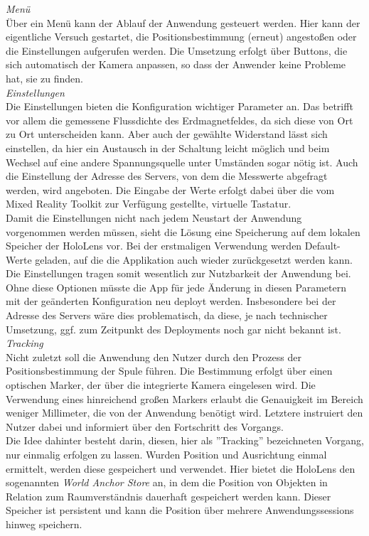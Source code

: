 \textit{Menü}\\
Über ein Menü kann der Ablauf der Anwendung gesteuert werden. Hier kann der eigentliche Versuch gestartet, die Positionsbestimmung (erneut) angestoßen oder die Einstellungen aufgerufen werden. Die Umsetzung erfolgt über Buttons, die sich automatisch der Kamera anpassen, so dass der Anwender keine Probleme hat, sie zu finden.\\

\textit{Einstellungen}\\
Die Einstellungen bieten die Konfiguration wichtiger Parameter an. Das betrifft vor allem die gemessene Flussdichte des Erdmagnetfeldes, da sich diese von Ort zu Ort unterscheiden kann. Aber auch der gewählte Widerstand lässt sich einstellen, da hier ein Austausch in der Schaltung leicht möglich und beim Wechsel auf eine andere Spannungsquelle unter Umständen sogar nötig ist. Auch die Einstellung der Adresse des Servers, von dem die Messwerte abgefragt werden, wird angeboten. Die Eingabe der Werte erfolgt dabei über die vom Mixed Reality Toolkit zur Verfügung gestellte, virtuelle Tastatur.\\

Damit die Einstellungen nicht nach jedem Neustart der Anwendung vorgenommen werden müssen, sieht die Lösung eine Speicherung auf dem lokalen Speicher der HoloLens vor. Bei der erstmaligen Verwendung werden Default-Werte geladen, auf die die Applikation auch wieder zurückgesetzt werden kann. Die Einstellungen tragen somit wesentlich zur Nutzbarkeit der Anwendung bei. Ohne diese Optionen müsste die App für jede Änderung in diesen Parametern mit der geänderten Konfiguration neu deployt werden. Insbesondere bei der Adresse des Servers wäre dies problematisch, da diese, je nach technischer Umsetzung, ggf. zum Zeitpunkt des Deployments noch gar nicht bekannt ist.\\

\textit{Tracking}\\
Nicht zuletzt soll die Anwendung den Nutzer durch den Prozess der Positionsbestimmung der Spule führen. Die Bestimmung erfolgt über einen optischen Marker, der über die integrierte Kamera eingelesen wird. Die Verwendung eines hinreichend großen Markers erlaubt die Genauigkeit im Bereich weniger Millimeter, die von der Anwendung benötigt wird. Letztere instruiert den Nutzer dabei und informiert über den Fortschritt des Vorgangs.\\
\noindent\hspace*{5mm}
Die Idee dahinter besteht darin, diesen, hier als ''Tracking'' bezeichneten Vorgang, nur einmalig erfolgen zu lassen. Wurden Position und Ausrichtung einmal ermittelt, werden diese gespeichert und verwendet. Hier bietet die HoloLens den sogenannten \textit{World Anchor Store} an, in dem die Position von Objekten in Relation zum Raumverständnis dauerhaft gespeichert werden kann. Dieser Speicher ist persistent und kann die Position über mehrere Anwendungssessions hinweg speichern.\\
 
